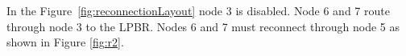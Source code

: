In the Figure~\ref{fig:reconnectionLayout} node 3 is disabled.
Node 6 and 7 route through node 3 to the LPBR. Nodes 6 and 7 must reconnect through node 5 as shown in Figure \ref{fig:r2}. 

\begin{figure}
\centering
{}        
\hfill        

\end{figure}
